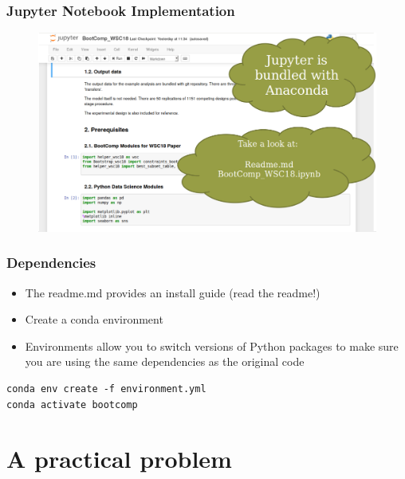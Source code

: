 \documentclass[aspectratio=169]{beamer}
\begin{document}
\begin{frame}
\frametitle{Jupyter Notebook Implementation}
\begin{figure}
\includegraphics[width=1.0\linewidth]{jupyter2.png}
\end{figure}
\end{frame}


\begin{frame}[fragile]
\frametitle{Dependencies}
\begin{itemize}
\item The readme.md provides an install guide (read the readme!)
\item Create a conda environment 
\item Environments allow you to switch versions of Python packages to make sure you are using the same dependencies as the original code
\end{itemize}

\begin{verbatim}
conda env create -f environment.yml
conda activate bootcomp
\end{verbatim}

\end{frame}


\section{A practical problem}
\end{document}
